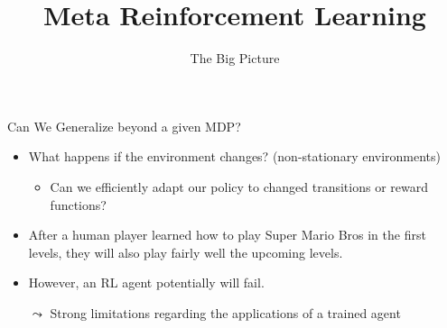 


\title[Meta-RL]{Meta Reinforcement Learning}
\subtitle{The Big Picture}



	
	\maketitle

\begin{frame}[c]{Can We Generalize beyond a given MDP?}
	
	\begin{itemize}
		\item What happens if the environment changes? (non-stationary environments)
		\begin{itemize}
			\item Can we efficiently adapt our policy to changed transitions or reward functions?
		\end{itemize}
		\smallskip
		\item After a human player learned how to play Super Mario Bros in the first levels, they will also play fairly well the upcoming levels.
		\item However, an RL agent potentially will fail.
		\item[$\leadsto$] Strong limitations regarding the applications of a trained agent
	\end{itemize}
	
\end{frame}
